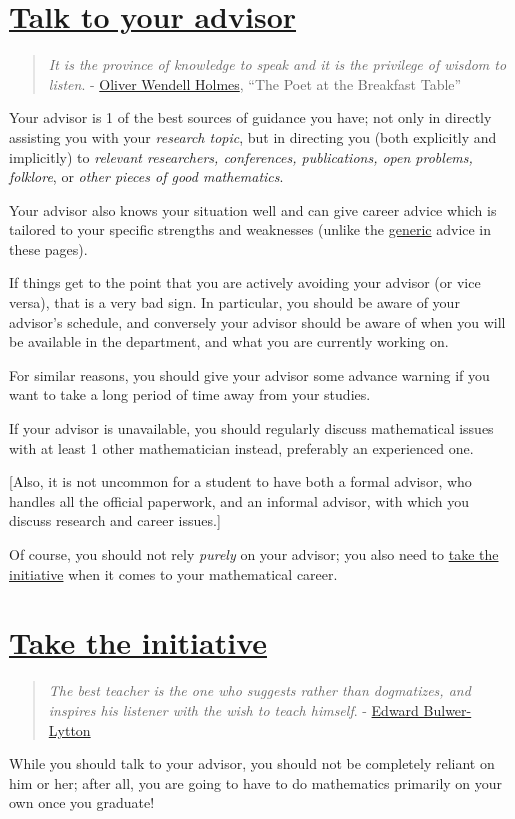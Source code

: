 \documentclass{book}
\numberwithin{equation}{section}
\begin{document}
\section{\href{https://terrytao.wordpress.com/career-advice/talk-to-your-advisor/}{Talk to your advisor}}
\begin{quotation}
    \textit{It is the province of knowledge to speak and it is the privilege of wisdom to listen}. - \href{https://en.wikipedia.org/wiki/Oliver_Wendell_Holmes_Sr.}{Oliver Wendell Holmes}, ``The Poet at the Breakfast Table''
\end{quotation}
Your advisor is 1 of the best sources of guidance you have; not only in directly assisting you with your \textit{research topic}, but in directing you (both explicitly and implicitly) to \textit{relevant researchers, conferences, publications, open problems, folklore}, or \textit{other pieces of good mathematics}.

Your advisor also knows your situation well and can give career advice which is tailored to your specific strengths and weaknesses (unlike the \href{https://terrytao.wordpress.com/career-advice/}{generic} advice in these pages).

%
If things get to the point that you are actively avoiding your advisor (or vice versa), that is a very bad sign. In particular, you should be aware of your advisor's schedule, and conversely your advisor should be aware of when you will be available in the department, and what you are currently working on.

%
For similar reasons, you should give your advisor some advance warning if you want to take a long period of time away from your studies.

%
If your advisor is unavailable, you should regularly discuss mathematical issues with at least 1 other mathematician instead, preferably an experienced one.

[Also, it is not uncommon for a student to have both a formal advisor, who handles all the official paperwork, and an informal advisor, with which you discuss research and career issues.]

%
Of course, you should not rely \textit{purely} on your advisor; you also need to \href{https://terrytao.wordpress.com/career-advice/take-the-initiative/}{take the initiative} when it comes to your mathematical career.

\section{\href{https://terrytao.wordpress.com/career-advice/take-the-initiative/}{Take the initiative}}
\begin{quotation}
    \textit{The best teacher is the one who suggests rather than dogmatizes, and inspires his listener with the wish to teach himself}. - \href{https://en.wikipedia.org/wiki/Edward_Bulwer-Lytton}{Edward Bulwer-Lytton}
\end{quotation}
While you should talk to your advisor, you should not be completely reliant on him or her; after all, you are going to have to do mathematics primarily on your own once you graduate!
\end{document}
